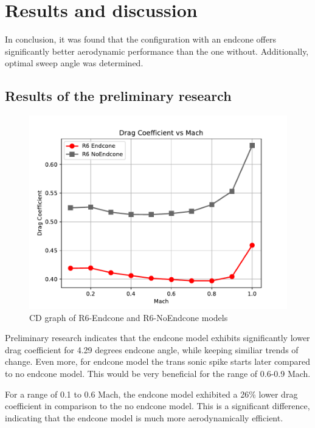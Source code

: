\documentclass{article}
\begin{document}
\section{Results and discussion}
In conclusion, it was found that the configuration with an endcone offers significantly better 
aerodynamic performance than the one without. Additionally, optimal sweep angle was determined.
\subsection{Results of the preliminary research}

\begin{figure}[H]
    \centering
    \includegraphics[width=\textwidth]{../data/DataAnalisysSolid/solidPreliminary.pdf}
    \caption{CD graph of R6-Endcone and R6-NoEndcone models}
    \label{fig:preliminary}
\end{figure}
Preliminary research indicates that the endcone model exhibits significantly lower drag coefficient
for 4.29 degrees endcone angle, while keeping similiar trends of change. Even more, for endcone model
the trans sonic spike starts later compared to no endcone model. This would be very beneficial for the
range of 0.6-0.9 Mach.  
\begin{table}[H]
    \centering
    \caption{Average values and differences}
\end{table}
For a range of 0.1 to 0.6 Mach, the endcone model exhibited a 26\% lower drag coefficient in 
comparison to the no endcone model. This is a significant difference, indicating that the endcone
model is much more aerodynamically efficient.
\newpage
\end{document}
